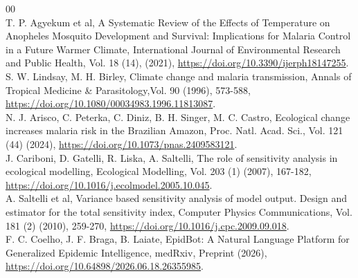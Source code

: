 \documentclass[a4paper,fleqn]{cas-dc}
\begin{document}
\begin{thebibliography}{00}
\\
 T. P. Agyekum et al, A Systematic Review of the Effects of Temperature on Anopheles Mosquito Development and Survival: Implications for Malaria Control in a Future Warmer Climate, International Journal of Environmental Research and Public Health, Vol. 18 (14), (2021), \href{https://doi.org/10.3390/ijerph18147255}{https://doi.org/10.3390/ijerph18147255}.
\\
 S. W. Lindsay, M. H. Birley, Climate change and malaria transmission, Annals of Tropical Medicine \& Parasitology,Vol. 90 (1996), 573-588, \href{https://doi.org/10.1080/00034983.1996.11813087}{https://doi.org/10.1080/00034983.1996.11813087}.
\\
 N. J. Arisco, C. Peterka, C. Diniz, B. H. Singer, M. C. Castro, Ecological change increases malaria risk in the Brazilian Amazon, Proc. Natl. Acad. Sci., Vol. 121 (44) (2024), \href{https://doi.org/10.1073/pnas.2409583121}{https://doi.org/10.1073/pnas.2409583121}.
\\
 J. Cariboni, D. Gatelli, R. Liska, A. Saltelli, The role of sensitivity analysis in ecological modelling, Ecological Modelling, Vol. 203 (1) (2007), 167-182, \href{https://doi.org/10.1016/j.ecolmodel.2005.10.045}{https://doi.org/10.1016/j.ecolmodel.2005.10.045}.
\\
 A. Saltelli et al, Variance based sensitivity analysis of model output. Design and estimator for the total sensitivity index, Computer Physics Communications, Vol. 181 (2) (2010), 259-270, \href{https://doi.org/10.1016/j.cpc.2009.09.018}{https://doi.org/10.1016/j.cpc.2009.09.018}.
\\
 F. C. Coelho, J. F. Braga, B. Laiate, EpidBot: A Natural Language Platform for Generalized Epidemic Intelligence, medRxiv, Preprint (2026), \href{https://doi.org/10.64898/2026.06.18.26355985}{https://doi.org/10.64898/2026.06.18.26355985}.
\\

\end{thebibliography}
\end{document}
